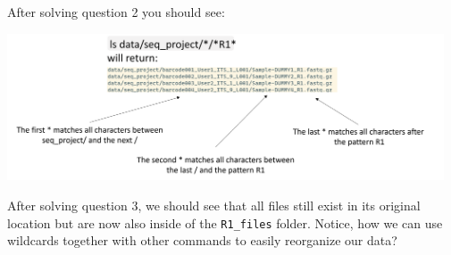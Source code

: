 \documentclass[
  letterpaper,
  DIV=11,
  numbers=noendperiod]{scrreprt}
\begin{document}
\begin{tcolorbox}
After solving question 2 you should see:

\includegraphics[width=5.09375in,height=\textheight]{../img/wildcards_3.png}

After solving question 3, we should see that all files still exist in
its original location but are now also inside of the \texttt{R1\_files}
folder. Notice, how we can use wildcards together with other commands to
easily reorganize our data?

\end{tcolorbox}
\end{document}
